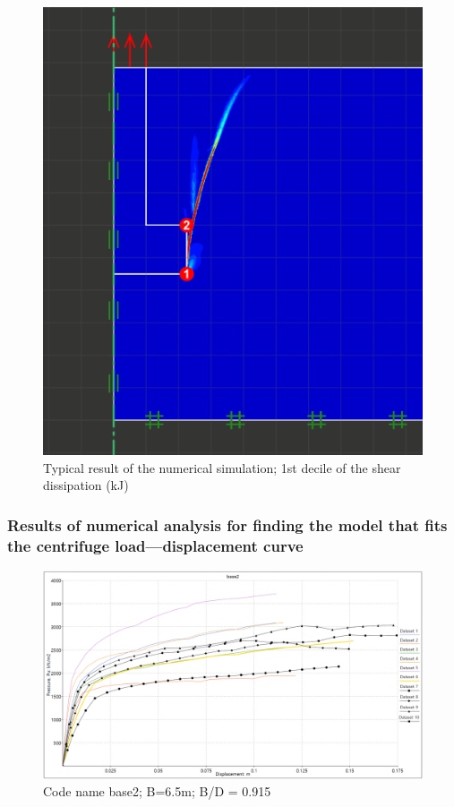 \documentclass[a4paper, nobind]{templates/ociamthesis}
\begin{document}
\begin{figure}[H]
\includegraphics[width=1\linewidth]{myfigureeeeee/typicalresult} \caption{Typical result of the numerical simulation; 1st decile of the shear dissipation (kJ)}\label{fig:unnamed-chunk-36}
\end{figure}

\hypertarget{results-of-numerical-analysis-for-finding-the-model-that-fits-the-centrifuge-loaddisplacement-curve}{%
\subsubsection{Results of numerical analysis for finding the model that fits the centrifuge load---displacement curve}\label{results-of-numerical-analysis-for-finding-the-model-that-fits-the-centrifuge-loaddisplacement-curve}}

\begin{figure}[H]
\includegraphics[width=1\linewidth]{myfigureeeeee/BASE2} \caption{Code name base2; B=6.5m; B/D = 0.915}\label{fig:unnamed-chunk-37}
\end{figure}
\end{document}

